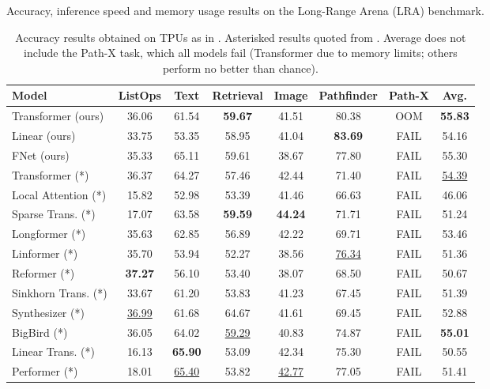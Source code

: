 \begin{table}[tb]
    \caption{Accuracy, inference speed and memory usage results on the Long-Range Arena (LRA) benchmark.}
    \label{tab:lra}
    \begin{subtable}[t]{\textwidth}
    \centering
    \begin{tabular}{l | c c c c c c | c}
        \hline
         Model & ListOps & Text & Retrieval & Image & Pathfinder & Path-X & Avg.  \\ \hline \hline
         Transformer (ours) & {36.06} & 61.54 & \textbf{59.67} & {41.51} & 80.38 & OOM & \textbf{55.83}  \\ 
         Linear (ours) & 33.75 & 53.35 & 58.95 & 41.04 & \textbf{83.69} & FAIL & 54.16 \\
         FNet (ours) & 35.33 & {65.11} & 59.61 & 38.67 & 77.80 & FAIL & 55.30  \\ \hline
         Transformer (*) & 36.37 & 64.27 & 57.46 & 42.44 & 71.40 & FAIL & \underline{54.39} \\
         Local Attention (*) & 15.82 & 52.98 & 53.39 & 41.46 & 66.63 & FAIL & 46.06 \\
         Sparse Trans. (*) & 17.07 & 63.58 & \textbf{59.59} & \textbf{44.24} & 71.71 & FAIL & 51.24 \\
         Longformer (*) & 35.63 & 62.85 & 56.89 & 42.22 & 69.71 & FAIL & 53.46 \\
         Linformer (*) & 35.70 & 53.94 & 52.27 & 38.56 & \underline{76.34} & FAIL & 51.36 \\
         Reformer (*) & \textbf{37.27} & 56.10  & 53.40 & 38.07 & 68.50 & FAIL & 50.67 \\
         Sinkhorn Trans. (*) & 33.67 & 61.20 & 53.83 & 41.23 & 67.45 & FAIL & 51.39 \\
         Synthesizer (*) & \underline{36.99} & 61.68 & 64.67 & 41.61 & 69.45 & FAIL & 52.88 \\
         BigBird (*) & 36.05 & 64.02 & \underline{59.29} & 40.83 & 74.87 & FAIL & \textbf{55.01} \\
         Linear Trans. (*) & 16.13 & \textbf{65.90} & 53.09 & 42.34 & 75.30 & FAIL & 50.55 \\
         Performer (*) & 18.01 & \underline{65.40} & 53.82 & \underline{42.77} & 77.05 & FAIL & 51.41  \\ \hline
    \end{tabular}
    \caption{Accuracy results obtained on TPUs as in \citet{tay2020long}. Asterisked results quoted from \citet{tay2020long}. Average does not include the Path-X task, which all models fail (Transformer due to memory limits; others perform no better than chance).}

\end{subtable}
\end{table}
